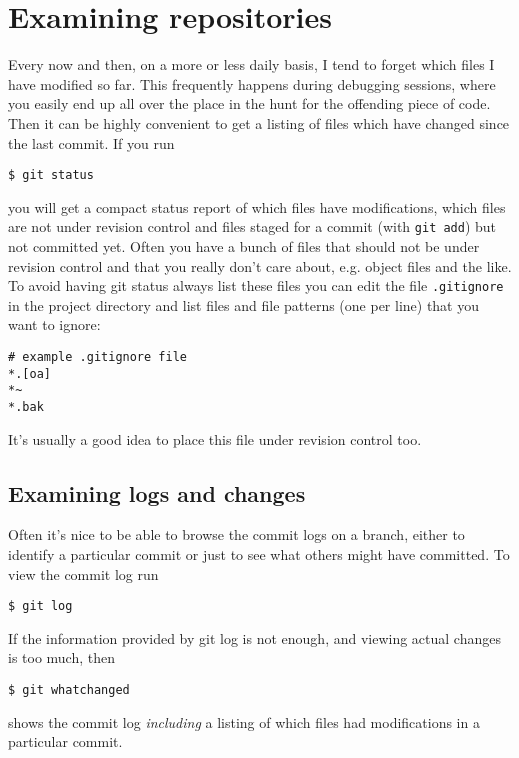 \documentclass[a4paper,10pt]{article}
\begin{document}
\section{Examining repositories}
\label{sec:examine}
Every now and then, on a more or less daily basis, I tend to forget which
files I have modified so far. This frequently happens during debugging
sessions, where you easily end up all over the place in the hunt for the
offending piece of code. Then it can be highly convenient to get a listing 
of files which have changed since the last commit. If you run
\begin{verbatim}
$ git status
\end{verbatim}
you will get a compact status report of which files have modifications, which
files are not under revision control and files staged for a commit (with
\texttt{git add}) but not committed yet. Often you have a bunch of files that
should not be under revision control and that you really don't care about,
e.g.  object files and the like. To avoid having git status always list these
files you can edit the file \texttt{.gitignore} in the project directory and
list files and file patterns (one per line) that you want to ignore:
\begin{verbatim}
# example .gitignore file
*.[oa]
*~
*.bak

\end{verbatim}
It's usually a good idea to place this file under revision control too.

\subsection{Examining logs and changes}
Often it's nice to be able to browse the commit logs on a branch, either
to identify a particular commit or just to see what others might have
committed. To view the commit log run
\begin{verbatim}
$ git log
\end{verbatim}
If the information provided by git log is not enough, and viewing actual
changes is too much, then
\begin{verbatim}
$ git whatchanged
\end{verbatim}
shows the commit log \emph{including} a listing of which files had
modifications in a particular commit. 
\end{document}
